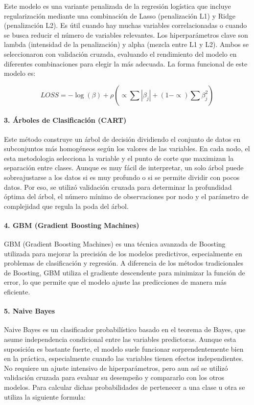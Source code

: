 \documentclass[12pt,a4paper,onecolumn]{article}
\begin{document}
Este modelo es una variante penalizada de la regresión logística que incluye regularización mediante una combinación de Lasso (penalización L1) y Ridge (penalización L2). Es útil cuando hay muchas variables correlacionadas o cuando se busca reducir el número de variables relevantes. Los hiperparámetros clave son lambda (intensidad de la penalización) y alpha (mezcla entre L1 y L2). Ambos se seleccionaron con validación cruzada, evaluando el rendimiento del modelo en diferentes combinaciones para elegir la más adecuada. La forma funcional de este modelo es:

$$LOSS = - \log(\beta) + \rho( \propto \sum_{}^{}\left| \beta_{j} \right| + (1 - \propto )\sum_{}^{}\beta_{j}^{2})$$

\paragraph{3. Árboles de Clasificación (CART)}

Este método construye un árbol de decisión dividiendo el conjunto de datos en subconjuntos más homogéneos según los valores de las variables. En cada nodo, el esta metodologia selecciona la variable y el punto de corte que maximizan la separación entre clases. Aunque es muy fácil de interpretar, un solo árbol puede sobreajustarse a los datos si es muy profundo o si se permite dividir con pocos datos. Por eso, se utilizó validación cruzada para determinar la profundidad óptima del árbol, el número mínimo de observaciones por nodo y el parámetro de complejidad que regula la poda del árbol.

\paragraph{4. GBM (Gradient Boosting Machines)}

GBM (Gradient Boosting Machines) es una técnica avanzada de Boosting utilizada para mejorar la precisión de los modelos predictivos, especialmente en problemas de clasificación y regresión. A diferencia de los métodos tradicionales de Boosting, GBM utiliza el gradiente descendente para minimizar la función de error, lo que permite que el modelo ajuste las predicciones de manera más eficiente.

\paragraph{5. Naive Bayes}

Naive Bayes es un clasificador probabilístico basado en el teorema de Bayes, que asume independencia condicional entre las variables predictoras. Aunque esta suposición es bastante fuerte, el modelo suele funcionar sorprendentemente bien en la práctica, especialmente cuando las variables tienen efectos independientes. No requiere un ajuste intensivo de hiperparámetros, pero aun así se utilizó validación cruzada para evaluar su desempeño y compararlo con los otros modelos. Para calcular dichas probabilidades de pertenecer a una clase u otra se utiliza la siguiente formula:
\end{document}
